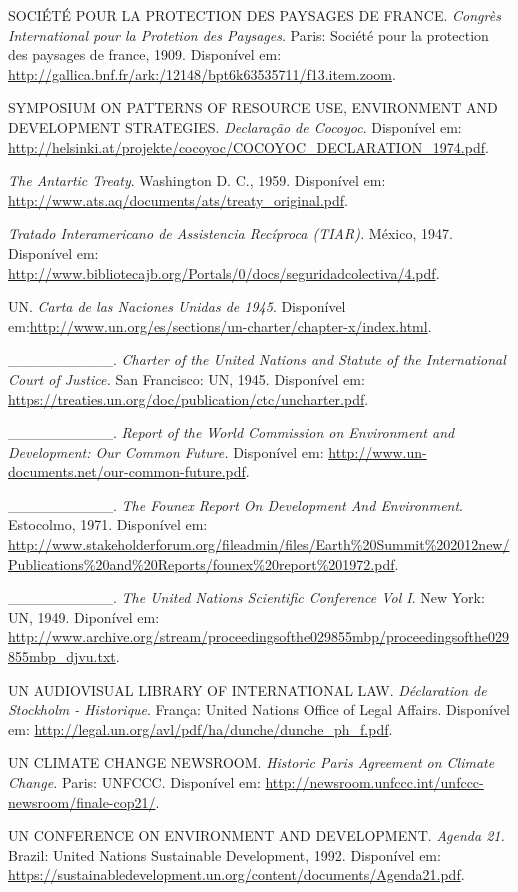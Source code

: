 SOCIÉTÉ POUR LA PROTECTION DES PAYSAGES DE FRANCE. \emph{Congrès
International pour la Protetion des Paysages}. Paris: Société pour la
protection des paysages de france, 1909. Disponível em:
\url{http://gallica.bnf.fr/ark:/12148/bpt6k63535711/f13.item.zoom}.

SYMPOSIUM ON PATTERNS OF RESOURCE USE, ENVIRONMENT AND DEVELOPMENT
STRATEGIES. \emph{Declaração de Cocoyoc}. Disponível em:
\url{http://helsinki.at/projekte/cocoyoc/COCOYOC_DECLARATION_1974.pdf}.

\emph{The Antartic Treaty}. Washington D. C., 1959. Disponível em:
\url{http://www.ats.aq/documents/ats/treaty_original.pdf}.

\emph{Tratado Interamericano de Assistencia Recíproca (TIAR).} México,
1947. Disponível em:
\url{http://www.bibliotecajb.org/Portals/0/docs/seguridadcolectiva/4.pdf}.

UN. \emph{Carta de las Naciones Unidas de 1945}. Disponível
em:\url{http://www.un.org/es/sections/un-charter/chapter-x/index.html}.

\_\_\_\_\_\_\_\_\_\_. \emph{Charter of the United Nations and Statute of
the International Court of Justice.} San Francisco: UN, 1945. Disponível
em: \url{https://treaties.un.org/doc/publication/ctc/uncharter.pdf}.

\_\_\_\_\_\_\_\_\_\_. \emph{Report of the World Commission on
Environment and Development: Our Common Future.} Disponível em:
\url{http://www.un-documents.net/our-common-future.pdf}.

\_\_\_\_\_\_\_\_\_\_. \emph{The Founex Report On Development And
Environment}. Estocolmo, 1971. Disponível em:
\url{http://www.stakeholderforum.org/fileadmin/files/Earth\%20Summit\%202012new/Publications\%20and\%20Reports/founex\%20report\%201972.pdf}.

\_\_\_\_\_\_\_\_\_\_. \emph{The United Nations Scientific Conference Vol
I}. New York: UN, 1949. Diponível em:
\url{http://www.archive.org/stream/proceedingsofthe029855mbp/proceedingsofthe029855mbp_djvu.txt}.

UN AUDIOVISUAL LIBRARY OF INTERNATIONAL LAW. \emph{Déclaration de
Stockholm - Historique}. França: United Nations Office of Legal Affairs.
Disponível em:
\url{http://legal.un.org/avl/pdf/ha/dunche/dunche_ph_f.pdf}.

UN CLIMATE CHANGE NEWSROOM. \emph{Historic Paris Agreement on Climate
Change.} Paris: UNFCCC. Disponível em:
\url{http://newsroom.unfccc.int/unfccc-newsroom/finale-cop21/}.

UN CONFERENCE ON ENVIRONMENT AND DEVELOPMENT. \emph{Agenda 21.} Brazil:
United Nations Sustainable Development, 1992. Disponível em:
\href{https://sustainabledevelopment.un.org/content/documents/Agenda21.pdf}{{https://sustainabledevelopment.un.org/content/documents/Agenda21.pdf}}.

